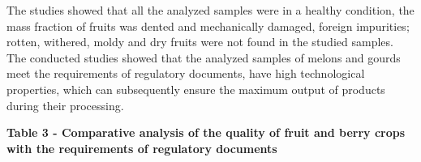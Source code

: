 
The studies showed that all the analyzed samples were in a healthy
condition, the mass fraction of fruits was dented and mechanically
damaged, foreign impurities; rotten, withered, moldy and dry fruits were
not found in the studied samples. The conducted studies showed that the
analyzed samples of melons and gourds meet the requirements of
regulatory documents, have high technological properties, which can
subsequently ensure the maximum output of products during their
processing.

{\bfseries Table 3 - Comparative analysis of the quality of fruit and berry
crops with the requirements of regulatory documents}

